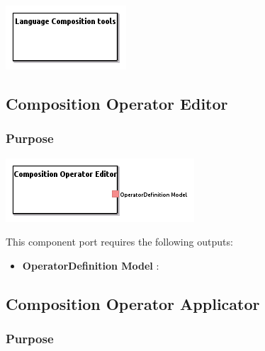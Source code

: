 \documentclass{gemoc} %
\begin{document}
\begin{center}
\includegraphics*[trim=0.0cm 0.0cm 0cm 0.0cm, clip=true]{../images/generated/Generated_Language_Composition_tools.png}
\end{center}



\subsection{Composition Operator Editor}


\subsubsection{Purpose}

\begin{center}
\includegraphics*[trim=0.0cm 0.0cm 0cm 0.0cm, clip=true]{../images/generated/Generated_Composition_Operator_Editor.png}
\end{center}


This component port requires the following outputs:
\begin{itemize}
  \item \textbf{OperatorDefinition Model} :
\end{itemize}

\subsection{Composition Operator Applicator}


\subsubsection{Purpose}
\end{document}
